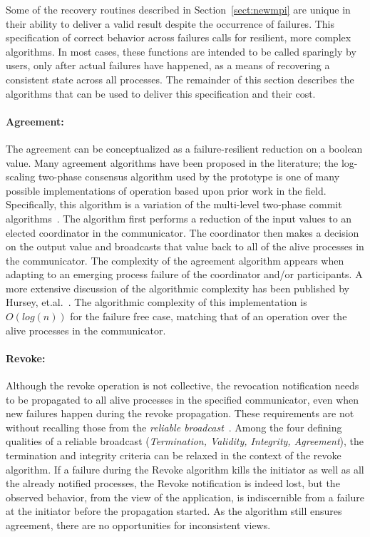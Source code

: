 Some of the recovery routines described in Section~\ref{sect:newmpi} are
unique in their ability to deliver a valid result despite the occurrence
of failures. This specification of correct behavior across failures calls
for resilient, more complex algorithms. In most cases, these functions
are intended to be called sparingly by users, only after actual failures have
happened, as a means of recovering a consistent state across all
processes. The remainder of this section describes the algorithms that
can be used to deliver this specification and their cost.

\paragraph*{Agreement:}
\label{subsect:agreement}

The agreement can be conceptualized as a failure-resilient reduction on
a boolean value. Many agreement algorithms have been proposed in the 
literature; the log-scaling two-phase consensus algorithm used by the \ulfm
prototype is one of many possible implementations of
 operation based upon prior work in the field.
Specifically, this algorithm is a variation of the multi-level two-phase
commit algorithms~\cite{Mohan_1985}. 
The algorithm first performs a reduction of the input values to an
elected coordinator in the communicator. The coordinator then makes a
decision on the output value and broadcasts that value back to all of
the alive processes in the communicator. The complexity of the agreement
algorithm appears when adapting to an emerging process failure of the
coordinator and/or participants. A more extensive discussion of the
algorithmic complexity has been published by Hursey,
et.al.~\cite{Hursey11LogConsensus}. The algorithmic complexity of this
implementation is $O(log(n))$ for the failure free case, matching that
of an  operation over the alive processes in the
communicator.

\paragraph*{Revoke:}
\label{subsect:revoke}

Although the revoke operation is not collective, the revocation notification
needs to be propagated to all alive processes in the specified communicator,
even when new failures happen during the revoke propagation.  These requirements
are not without recalling those from the \emph{reliable
  broadcast}~\cite{Hadzilacos:1993:FBR:302430.302435}.  Among the four defining
qualities of a reliable broadcast (\emph{Termination, Validity, Integrity,
  Agreement}), the termination and integrity criteria can be relaxed in the
context of the revoke algorithm. If a failure during the Revoke
algorithm kills the initiator as well as all the already notified processes, the Revoke
notification is indeed lost, but the observed behavior, from the view of the
application, is indiscernible from a failure at the initiator before the
propagation started. As the algorithm still ensures agreement, there are no
opportunities for inconsistent views.

